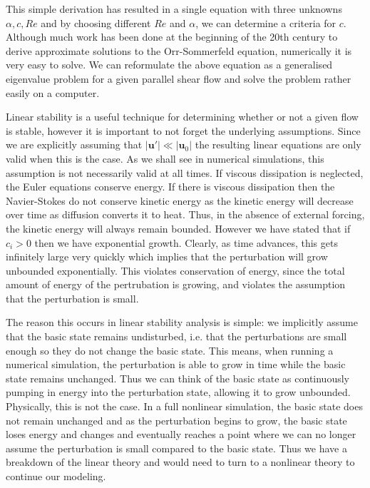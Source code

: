 This simple derivation has resulted in a single equation with three unknowns $\alpha,c,Re$ and by choosing different $Re$ and $\alpha$, we can determine a criteria for $c$. Although much work has been done at the beginning of the 20th century to derive approximate solutions to the Orr-Sommerfeld equation, numerically it is very easy to solve. We can reformulate the above equation as a generalised eigenvalue problem for a given parallel shear flow and solve the problem rather easily on a computer\cite{trefethen_spectral}.

Linear stability is a useful technique for determining whether or not a given flow is stable, however it is important to not forget the underlying assumptions. Since we are explicitly assuming that $|\bm{u}'|\ll |\bm{u}_{0}|$ the resulting linear equations are only valid when this is the case. As we shall see in numerical simulations, this assumption is not necessarily valid at all times. If viscous dissipation is neglected, the Euler equations conserve energy. If there is viscous dissipation then the Navier-Stokes do not conserve kinetic energy as the kinetic energy will decrease over time as diffusion converts it to heat. Thus, in the absence of external forcing, the kinetic energy will always remain bounded.  However we have stated that if $c_{i}>0$ then we have exponential growth. Clearly, as time advances, this gets infinitely large very quickly which implies that the perturbation will grow unbounded exponentially. This violates conservation of energy, since the total amount of energy of the pertrubation is growing, and violates the assumption that the perturbation is small.  

The reason this occurs in linear stability analysis is simple: we implicitly assume that the basic state remains undisturbed, i.e. that the perturbations are small enough so they do not change the basic state. This means, when running a numerical simulation, the perturbation is able to grow in time while the basic state remains unchanged. Thus we can think of the basic state as continuously pumping in energy into the perturbation state, allowing it to grow unbounded. Physically, this is not the case. In a full nonlinear simulation, the basic state does not remain unchanged and as the perturbation begins to grow, the basic state loses energy and changes and eventually reaches a point where we can no longer assume the perturbation is small compared to the basic state. Thus we have a breakdown of the linear theory and would need to turn to a nonlinear theory to continue our modeling. 

